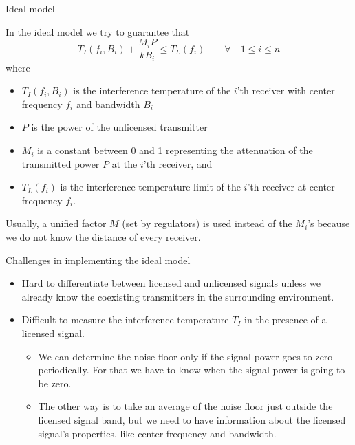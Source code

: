 \documentclass[mathserif]{beamer}
\begin{document}
\begin{frame}{Ideal model}

In the ideal model we try to guarantee that
\begin{equation}
    T_I(f_i,B_i) + \frac{M_iP}{kB_i} \leq T_L(f_i) \qquad \forall \quad 1 \leq i \leq n \label{idealModel}
\end{equation}
where

\pause
\begin{itemize}
	
	\item $T_I(f_i,B_i)$ is  the interference temperature of the $i$'th receiver with center frequency $f_i$ and bandwidth $B_i$
	\item $P$ is the power of the unlicensed transmitter
	\item $M_i$ is a constant between 0 and 1 representing the attenuation of the  transmitted power $P$ at the $i$'th receiver, and
	\item $T_L(f_i)$ is the interference temperature limit of the $i$'th receiver at center frequency $f_i$.
\end{itemize}

\pause
Usually, a unified factor $M$ (set by regulators) is used instead of the $M_i$'s because we do not know the distance of every receiver. \end{frame}




\begin{frame}{Challenges in implementing the ideal model}

\begin{itemize}
    \item Hard to differentiate between licensed and unlicensed signals unless we already know the coexisting transmitters in the surrounding environment.
    \item Difficult to measure the interference temperature $T_I$ in the presence of a licensed signal. \begin{itemize}
    \item We can determine the noise floor only if the signal power goes to zero periodically. For that we have to know when the signal power is going to be zero.
    \item The other way is to take an average of the noise floor just outside the licensed signal band, but we need to have information about the licensed signal's properties, like center frequency and bandwidth.
    \end{itemize}
\end{itemize}

\end{frame}
\end{document}
